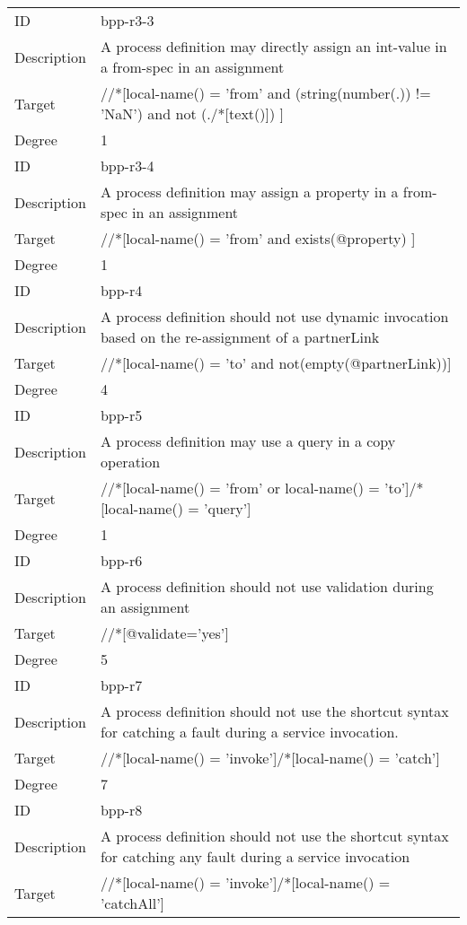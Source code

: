 \begin{center}
\begin{tiny}
\begin{longtable}{p{}|p{}}
\midrule
ID & bpp-r3-3\\
\myrowcolour
Description &A process definition may directly assign an int-value in a from-spec in an assignment\\
Target & //*[local-name() = 'from' and (string(number(.)) != 'NaN') and not (./*[text()]) ]\\
\myrowcolour
Degree & 1\\
\midrule
ID & bpp-r3-4\\
\myrowcolour
Description &A process definition may assign a property in a from-spec in an assignment\\
Target & //*[local-name() = 'from' and exists(@property) ]\\
\myrowcolour
Degree & 1\\
\midrule
ID & bpp-r4\\
\myrowcolour
Description &A process definition should not use dynamic invocation based on the re-assignment of a partnerLink\\
Target & //*[local-name() = 'to' and not(empty(@partnerLink))]\\
\myrowcolour
Degree & 4\\
\midrule
ID & bpp-r5\\
\myrowcolour
Description &A process definition may use a query in a copy operation\\
Target & //*[local-name() = 'from' or local-name() = 'to']/*[local-name() = 'query']\\
\myrowcolour
Degree & 1\\
\midrule
ID & bpp-r6\\
\myrowcolour
Description &A process definition should not use validation during an assignment\\
Target & //*[@validate='yes']\\
\myrowcolour
Degree & 5\\
\midrule
ID & bpp-r7\\
\myrowcolour
Description &A process definition should not use the shortcut syntax for catching a fault during a service invocation.\\
Target & //*[local-name() = 'invoke']/*[local-name() = 'catch']\\
\myrowcolour
Degree & 7\\
\midrule
ID & bpp-r8\\
\myrowcolour
Description &A process definition should not use the shortcut syntax for catching any fault during a service invocation\\
Target & //*[local-name() = 'invoke']/*[local-name() = 'catchAll']\\

\end{longtable}
\end{tiny}
\end{center}
